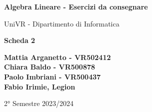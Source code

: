 \begin{titlepage}
	\begin{center}
		\vspace*{1cm}

		\Huge
		\textbf{Algebra Lineare - Esercizi da consegnare}

		\vspace{0.5cm}
		\LARGE
		UniVR - Dipartimento di Informatica

		\vspace{1cm}
		\huge
		\textbf{Scheda 2}
		\vspace{1.5cm}


		\vfill


		\vspace{0.8cm}

		\Large
		\textbf{Mattia Arganetto - VR502412}\\
		\textbf{Chiara Baldo - VR500878}\\
		\textbf{Paolo Imbriani - VR500437}\\
		\textbf{Fabio Irimie, Legion}

		\vspace{0.5cm}

		2° Semestre 2023/2024

	\end{center}
\end{titlepage}

